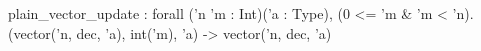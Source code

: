 plain_vector_update : forall ('n 'm : Int)('a : Type), (0 <= 'm & 'm < 'n).
  (vector('n, dec, 'a), int('m), 'a) -> vector('n, dec, 'a)